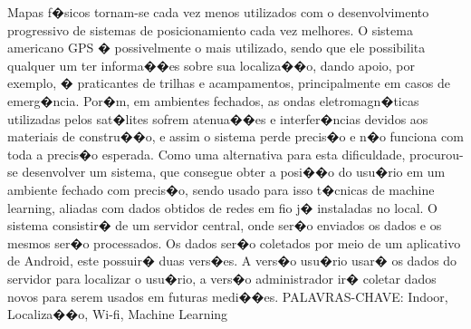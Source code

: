 





\monografiaFormatura






\dedicatoria{}

\capa{}

\folhaderosto{}


\renewcommand{\PoliFichaCatalograficaData}{%
  1. Assunto \#1. 2. Assunto \#2. 3. Assunto \#3.
  I. Universidade de S�o Paulo. Escola Polit�cnica.
  \PoliDepartamentoData. II. t.}

\fichacatalografica %

\paginadedicatoria{}

\begin{agradecimentos}
\end{agradecimentos}

\begin{resumo}
Mapas f�sicos tornam-se cada vez menos utilizados com o desenvolvimento
progressivo de sistemas de posicionamiento cada vez melhores. O sistema americano
GPS � possivelmente o mais utilizado, sendo que ele possibilita qualquer um ter
informa��es sobre sua localiza��o, dando apoio, por exemplo, � praticantes de trilhas e
acampamentos, principalmente em casos de emerg�ncia. Por�m, em ambientes
fechados, as ondas eletromagn�ticas utilizadas pelos sat�lites sofrem atenua��es e
interfer�ncias devidos aos materiais de constru��o, e assim o sistema perde precis�o e
n�o funciona com toda a precis�o esperada. Como uma alternativa para esta dificuldade,
procurou-se desenvolver um sistema, que consegue obter a posi��o do usu�rio em um
ambiente fechado com precis�o, sendo usado para isso t�cnicas de machine learning,
aliadas com dados obtidos de redes em fio j� instaladas no local. O sistema consistir� de
um servidor central, onde ser�o enviados os dados e os mesmos ser�o processados. Os
dados ser�o coletados por meio de um aplicativo de Android, este possuir� duas vers�es.
A vers�o usu�rio usar� os dados do servidor para localizar o usu�rio, a vers�o
administrador ir� coletar dados novos para serem usados em futuras medi��es.
PALAVRAS-CHAVE: Indoor, Localiza��o, Wi-fi, Machine Learning
\end{resumo}


